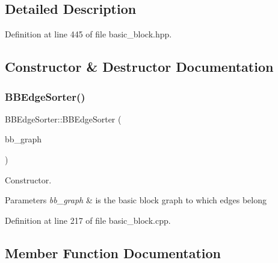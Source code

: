 \subsection{Detailed Description}


Definition at line 445 of file basic\+\_\+block.\+hpp.



\subsection{Constructor \& Destructor Documentation}
\mbox{\label{classBBEdgeSorter_a2d5656a464a7b162837eb158912df806}} 
\subsubsection{\texorpdfstring{B\+B\+Edge\+Sorter()}{BBEdgeSorter()}}
{\footnotesize\ttfamily B\+B\+Edge\+Sorter\+::\+B\+B\+Edge\+Sorter (\begin{DoxyParamCaption}\item[{const \hyperlink{basic__block_8hpp_ab66bdbde3a29e41d079d8a320af9c921}{B\+B\+Graph\+Const\+Ref}}]{bb\+\_\+graph }\end{DoxyParamCaption})\hspace{0.3cm}{\ttfamily [explicit]}}



Constructor. 


\begin{DoxyParams}{Parameters}
{\em bb\+\_\+graph} & is the basic block graph to which edges belong \\
\hline
\end{DoxyParams}


Definition at line 217 of file basic\+\_\+block.\+cpp.



\subsection{Member Function Documentation}
\mbox{\label{classBBEdgeSorter_ab91b7b149bd5c6fcd69e321daef20459}} 
